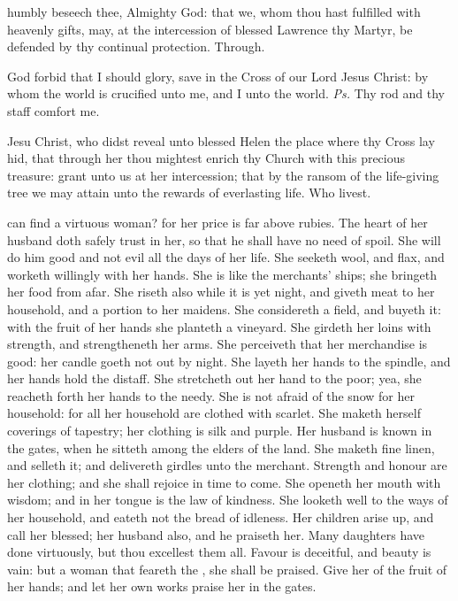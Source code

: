
\postcommunion
{} humbly beseech thee, Almighty God: that we, whom thou hast fulfilled with heavenly gifts, may, at the intercession of blessed Lawrence thy Martyr, be defended by thy continual protection. Through.



\introit
{} God forbid that I should glory, save in the Cross of our Lord Jesus Christ: by whom the world is crucified unto me, and I unto the world. \textit{Ps.} Thy rod and thy staff comfort me.

\collect
{} Jesu Christ, who didst reveal unto blessed Helen the place where thy Cross lay hid, that through her thou mightest enrich thy Church with this precious treasure: grant unto us at her intercession; that by the ransom of the life-giving tree we may attain unto the rewards of everlasting life. Who livest.

 can find a virtuous woman? for her price is far above rubies. The heart of her husband doth safely trust in her, so that he shall have no need of spoil. She will do him good and not evil all the days of her life. She seeketh wool, and flax, and worketh willingly with her hands. She is like the merchants' ships; she bringeth her food from afar. She riseth also while it is yet night, and giveth meat to her household, and a portion to her maidens. She considereth a field, and buyeth it: with the fruit of her hands she planteth a vineyard. She girdeth her loins with strength, and strengtheneth her arms. She perceiveth that her merchandise is good: her candle goeth not out by night. She layeth her hands to the spindle, and her hands hold the distaff. She stretcheth out her hand to the poor; yea, she reacheth forth her hands to the needy. She is not afraid of the snow for her household: for all her household are clothed with scarlet. She maketh herself coverings of tapestry; her clothing is silk and purple. Her husband is known in the gates, when he sitteth among the elders of the land. She maketh fine linen, and selleth it; and delivereth girdles unto the merchant. Strength and honour are her clothing; and she shall rejoice in time to come. She openeth her mouth with wisdom; and in her tongue is the law of kindness. She looketh well to the ways of her household, and eateth not the bread of idleness. Her children arise up, and call her blessed; her husband also, and he praiseth her. Many daughters have done virtuously, but thou excellest them all. Favour is deceitful, and beauty is vain: but a woman that feareth the , she shall be praised. Give her of the fruit of her hands; and let her own works praise her in the gates.

